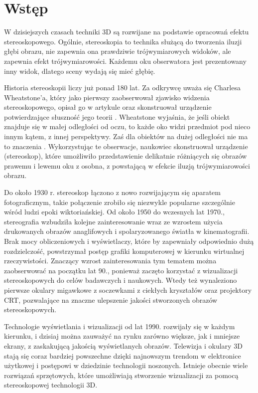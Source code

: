 
\graphicspath{{images/}}



\thesisstyle
\tableofcontents

\newpage 
\section[Wstęp]{Wstęp}
W dzisiejszych czasach techniki 3D są rozwijane na podstawie opracowań efektu stereoskopowego. Ogólnie, stereoskopia to technika służącą do tworzenia iluzji głębi obrazu, nie zapewnia ona prawdziwie trójwymiarowych widoków, ale zapewnia efekt trójwymiarowości. Każdemu oku obserwatora jest prezentowany inny widok, dlatego sceny wydają się mieć głębię.

Historia stereoskopii liczy już ponad 180 lat. Za odkrywcę uważa się Charlesa Wheatstone'a, który jako pierwszy zaobserwował zjawisko widzenia stereoskopowego, opisał go w artykule oraz skonstruował urządzenie potwierdzające słuszność jego teorii \cite{stereoscopehistory}. Wheatstone wyjaśnia, że jeśli obiekt znajduje się w małej odległości od oczu, to każde oko widzi przedmiot pod nieco innym kątem, z innej perspektywy. Zaś dla obiektów na dużej odległości nie ma to znaczenia \cite{wheatstone}. Wykorzystując te obserwacje, naukowiec skonstruował urządzenie (stereoskop), które umożliwiło przedstawienie delikatnie różniących się obrazów prawemu i lewemu oku z osobna, z powstającą w efekcie iluzją trójwymiarowości obrazu.

Do około 1930 r. stereoskop łączono z nowo rozwijającym się aparatem fotograficznym, takie połączenie zrobiło się niezwykle popularne szczególnie wśród ludzi epoki wiktoriańskiej. Od około 1950 do wczesnych lat 1970., stereografia wzbudziła kolejne zainteresowanie wraz ze wzrostem użycia drukowanych obrazów anaglifowych i spolaryzowanego światła w kinematografii. Brak mocy obliczeniowych i wyświetlaczy, które by zapewniały odpowiednio dużą rozdzielczość, powstrzymał postęp grafiki komputerowej w kierunku wirtualnej rzeczywistości. Znaczący wzrost zainteresowania tym tematem można zaobserwować na początku lat 90., ponieważ zaczęto korzystać z wizualizacji stereoskopowych do celów badawczych i naukowych. Wtedy też wynaleziono pierwsze okulary migawkowe z soczewkami z ciekłych kryształów oraz projektory CRT, pozwalające na znaczne ulepszenie jakości stworzonych obrazów stereoskopowych.

Technologie wyświetlania i wizualizacji od lat 1990. rozwijały się w każdym kierunku, i dzisiaj można zauważyć na rynku zarówno większe, jak i mniejsze ekrany, z zaskakującą jakością wyświetlanych obrazów. Telewizja i okulary 3D stają się coraz bardziej powszechne dzięki najnowszym trendom w elektronice użytkowej i postępowi w dziedzinie technologii noszonych. Istnieje obecnie wiele rozwiązań sprzętowych, które umożliwiają stworzenie wizualizacji za pomocą stereoskopowej technologii 3D. 

